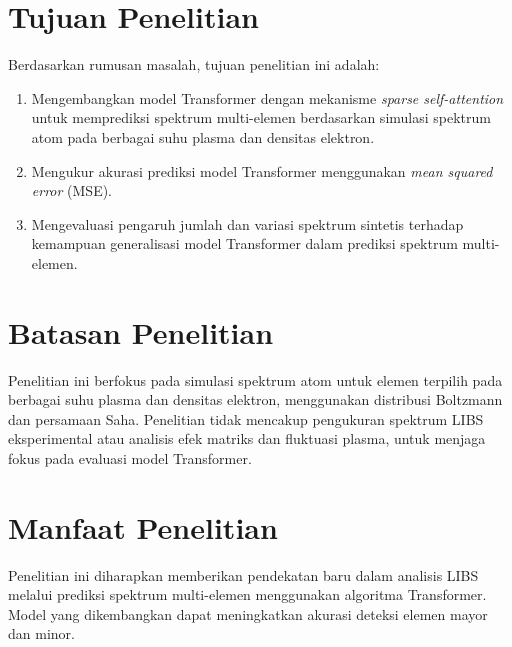 \section{Tujuan Penelitian}
Berdasarkan rumusan masalah, tujuan penelitian ini adalah:
\begin{enumerate}

    \item Mengembangkan model Transformer dengan mekanisme \textit{sparse self-attention} untuk memprediksi spektrum multi-elemen berdasarkan simulasi spektrum atom pada berbagai suhu plasma dan densitas elektron.
    \item Mengukur akurasi prediksi model Transformer menggunakan \textit{mean squared error} (MSE).
    \item Mengevaluasi pengaruh jumlah dan variasi spektrum sintetis terhadap kemampuan generalisasi model Transformer dalam prediksi spektrum multi-elemen.
\end{enumerate}
\section{Batasan Penelitian}
Penelitian ini berfokus pada simulasi spektrum atom untuk elemen terpilih pada berbagai suhu plasma dan densitas elektron, menggunakan distribusi Boltzmann dan persamaan Saha. Penelitian tidak mencakup pengukuran spektrum LIBS eksperimental atau analisis efek matriks dan fluktuasi plasma, untuk menjaga fokus pada evaluasi model Transformer.

\section{Manfaat Penelitian}
Penelitian ini diharapkan memberikan pendekatan baru dalam analisis LIBS melalui prediksi spektrum multi-elemen menggunakan algoritma Transformer. Model yang dikembangkan dapat meningkatkan akurasi deteksi elemen mayor dan minor.

